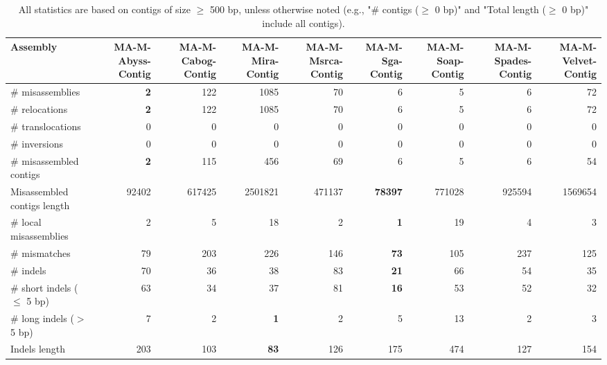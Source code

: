\documentclass[12pt,a4paper]{article}
\begin{document}
\begin{table}[ht]
\begin{center}
\caption{All statistics are based on contigs of size $\geq$ 500 bp, unless otherwise noted (e.g., "\# contigs ($\geq$ 0 bp)" and "Total length ($\geq$ 0 bp)" include all contigs).}
\begin{tabular}{|l*{8}{|r}|}
\hline
Assembly & MA-M-Abyss-Contig & MA-M-Cabog-Contig & MA-M-Mira-Contig & MA-M-Msrca-Contig & MA-M-Sga-Contig & MA-M-Soap-Contig & MA-M-Spades-Contig & MA-M-Velvet-Contig \\ \hline
\# misassemblies & {\bf 2} & 122 & 1085 & 70 & 6 & 5 & 6 & 72 \\ \hline
\hspace{5mm}\# relocations & {\bf 2} & 122 & 1085 & 70 & 6 & 5 & 6 & 72 \\ \hline
\hspace{5mm}\# translocations & 0 & 0 & 0 & 0 & 0 & 0 & 0 & 0 \\ \hline
\hspace{5mm}\# inversions & 0 & 0 & 0 & 0 & 0 & 0 & 0 & 0 \\ \hline
\# misassembled contigs & {\bf 2} & 115 & 456 & 69 & 6 & 5 & 6 & 54 \\ \hline
Misassembled contigs length & 92402 & 617425 & 2501821 & 471137 & {\bf 78397} & 771028 & 925594 & 1569654 \\ \hline
\# local misassemblies & 2 & 5 & 18 & 2 & {\bf 1} & 19 & 4 & 3 \\ \hline
\# mismatches & 79 & 203 & 226 & 146 & {\bf 73} & 105 & 237 & 125 \\ \hline
\# indels & 70 & 36 & 38 & 83 & {\bf 21} & 66 & 54 & 35 \\ \hline
\hspace{5mm}\# short indels ($\leq$ 5 bp) & 63 & 34 & 37 & 81 & {\bf 16} & 53 & 52 & 32 \\ \hline
\hspace{5mm}\# long indels ($>$ 5 bp) & 7 & 2 & {\bf 1} & 2 & 5 & 13 & 2 & 3 \\ \hline
Indels length & 203 & 103 & {\bf 83} & 126 & 175 & 474 & 127 & 154 \\ \hline
\end{tabular}
\end{center}
\end{table}
\end{document}
